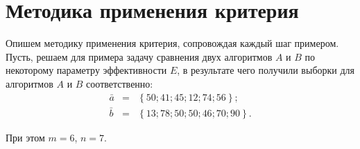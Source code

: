 \documentclass[a4paper,12pt]{article}
\begin{document}
\section{Методика применения критерия}\label{WilcoxonW:section_method}

Опишем методику применения критерия, сопровождая каждый шаг примером. Пусть, решаем для примера задачу сравнения двух алгоритмов $A$ и $B$ по некоторому параметру эффективности $E$, в результате чего получили выборки для алгоритмов $A$ и $B$ соответственно:
\begin{eqnarray*}
\bar{a}&=&\left\lbrace 50; 41; 45; 12; 74; 56\right\rbrace ;\\
\bar{b}&=&\left\lbrace 13; 78; 50; 50; 46; 70; 90\right\rbrace .
\end{eqnarray*}

При этом $m=6$, $n=7$.
\end{document}

